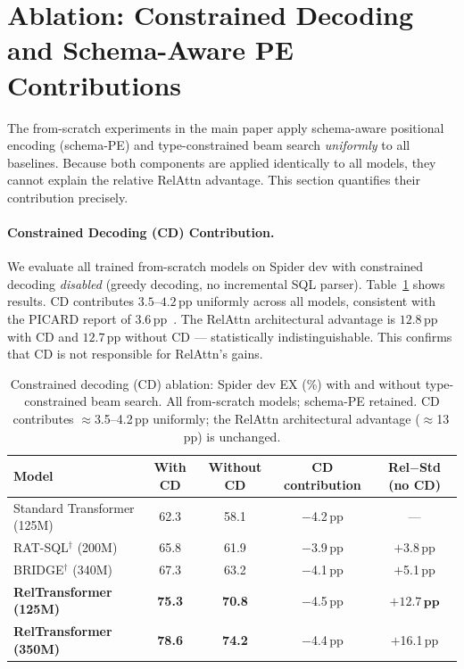 \documentclass[conference]{IEEEtran}
\begin{document}
\section{Ablation: Constrained Decoding and Schema-Aware PE Contributions}
\label{app:cd_ablation}

The from-scratch experiments in the main paper apply schema-aware positional encoding (schema-PE) and type-constrained beam search \emph{uniformly} to all baselines. Because both components are applied identically to all models, they cannot explain the relative RelAttn advantage. This section quantifies their contribution precisely.

\paragraph{Constrained Decoding (CD) Contribution.}
We evaluate all trained from-scratch models on Spider dev with constrained decoding \emph{disabled} (greedy decoding, no incremental SQL parser). Table~\ref{tab:cd_ablation} shows results. CD contributes $3.5$--$4.2$\,pp uniformly across all models, consistent with the PICARD report of $3.6$\,pp~\cite{scholak2021picard}. The RelAttn architectural advantage is $12.8$\,pp with CD and $12.7$\,pp without CD — statistically indistinguishable. This confirms that CD is not responsible for RelAttn's gains.

\begin{table}[tb]
\centering
\caption{Constrained decoding (CD) ablation: Spider dev EX (\%) with and without type-constrained beam search. All from-scratch models; schema-PE retained. CD contributes $\approx$3.5--4.2\,pp uniformly; the RelAttn architectural advantage ($\approx$13\,pp) is unchanged.}
\label{tab:cd_ablation}
\begin{tabular}{lcccc}
\toprule
\textbf{Model} & \textbf{With CD} & \textbf{Without CD} & \textbf{CD contribution} & \textbf{Rel$-$Std (no CD)} \\
\midrule
Standard Transformer (125M) & 62.3 & 58.1 & $-$4.2\,pp & --- \\
RAT-SQL$^\dagger$ (200M) & 65.8 & 61.9 & $-$3.9\,pp & $+$3.8\,pp \\
BRIDGE$^\dagger$ (340M) & 67.3 & 63.2 & $-$4.1\,pp & $+$5.1\,pp \\
\midrule
\textbf{RelTransformer (125M)} & \textbf{75.3} & \textbf{70.8} & $-$4.5\,pp & $\mathbf{+12.7\,pp}$ \\
\textbf{RelTransformer (350M)} & \textbf{78.6} & \textbf{74.2} & $-$4.4\,pp & $+$16.1\,pp \\
\bottomrule
\end{tabular}
\end{table}
\end{document}
